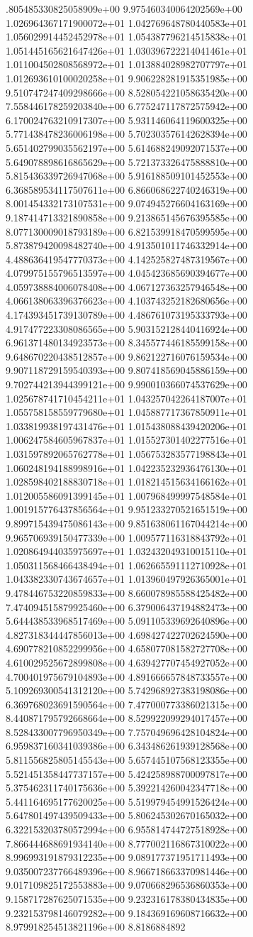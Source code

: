 .805485330825058909e+00	9.975460340064202569e+00	1.026964367171900072e+01	1.042769648780440583e+01	1.056029914452452978e+01	1.054387796214515838e+01	1.051445165621647426e+01	1.030396722214041461e+01	1.011004502808568972e+01	1.013884028982707797e+01	1.012693610100020258e+01	9.906228281915351985e+00	9.510747247409298666e+00	8.528054221058635420e+00	7.558446178259203840e+00	6.775247117872575942e+00	6.170024763210917307e+00	5.931146064119600325e+00	5.771438478236006198e+00	5.702303576142628394e+00	5.651402799035562197e+00	5.614688249092071537e+00	5.649078898616865629e+00	5.721373326475888810e+00	5.815436339726947068e+00	5.916188509101452553e+00	6.368589534117507611e+00	6.866068622740246319e+00	8.001454332173107531e+00	9.074945276604163169e+00	9.187414713321890858e+00	9.213865145676395585e+00	8.077130009018793189e+00	6.821539918470599595e+00	5.873879420098482740e+00	4.913501011746332914e+00	4.488636419547770373e+00	4.142525827487319567e+00	4.079975155796513597e+00	4.045423685690394677e+00	4.059738884006078408e+00	4.067127363257946548e+00	4.066138063396376623e+00	4.103743252182680656e+00	4.174393451739130789e+00	4.486761073195333793e+00	4.917477223308086565e+00	5.903152128440416924e+00	6.961371480134923573e+00	8.345577446185599158e+00	9.648670220438512857e+00	9.862122716076159534e+00	9.907118729159540393e+00	9.807418569045886159e+00	9.702744213944399121e+00	9.990010366074537629e+00	1.025678741710454211e+01	1.043257042264187007e+01	1.055758158559779680e+01	1.045887717367850911e+01	1.033819938197431476e+01	1.015438088439420206e+01	1.006247584605967837e+01	1.015527301402277516e+01	1.031597892065762778e+01	1.056753283577198843e+01	1.060248194188998916e+01	1.042235232936476130e+01	1.028598402188830718e+01	1.018214515634166162e+01	1.012005586091399145e+01	1.007968499997548584e+01	1.001915776437856564e+01	9.951233270521651519e+00	9.899715439475086143e+00	9.851638061167044214e+00	9.965706939150477339e+00	1.009577116318843792e+01	1.020864944035975697e+01	1.032432049310015110e+01	1.050311568466438494e+01	1.062665591112710928e+01	1.043382330743674657e+01	1.013960497926365001e+01	9.478446753220859833e+00	8.660078985588425482e+00	7.474094515879925460e+00	6.379006437194882473e+00	5.644438533968517469e+00	5.091105339692640896e+00	4.827318344447856013e+00	4.698427422702624590e+00	4.690778210852299956e+00	4.658077081582727708e+00	4.610029525672899808e+00	4.639427707454927052e+00	4.700401975679104893e+00	4.891666657848733557e+00	5.109269300541312120e+00	5.742968927383198086e+00	6.369768023691590564e+00	7.477000773386021315e+00	8.440871795792668664e+00	8.529922099294017457e+00	8.528433007796950349e+00	7.757049696428104824e+00	6.959837160341039386e+00	6.343486261939128568e+00	5.811556825805145543e+00	5.657445107568123355e+00	5.521451358447737157e+00	5.424258988700097817e+00	5.375462311740175636e+00	5.392214260042347718e+00	5.441164695177620025e+00	5.519979454991526424e+00	5.647801497439509433e+00	5.806245302670165032e+00	6.322153203780572994e+00	6.955814744727518928e+00	7.866444688691934140e+00	8.777002116867310022e+00	8.996993191879312235e+00	9.089177371951711493e+00	9.035007237766489396e+00	8.966718663370981446e+00	9.017109825172553883e+00	9.070668296536860353e+00	9.158717287625071535e+00	9.232316178380434835e+00	9.232153798146079282e+00	9.184369169608716632e+00	8.979918254513821196e+00	8.8186884892